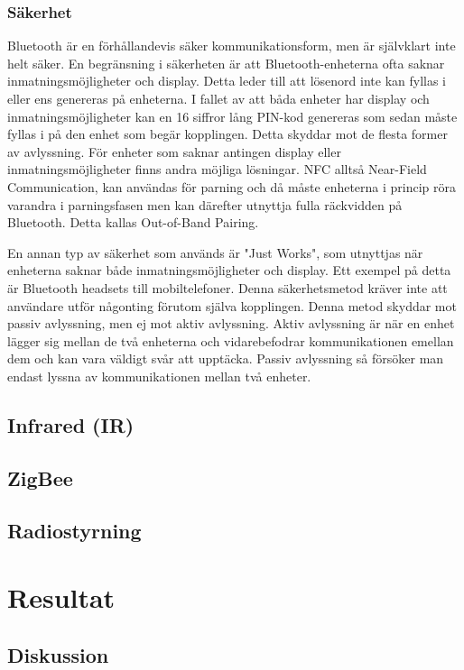 \documentclass[a4paper,12pt,fleqn]{article}
\begin{document}
\subsubsection{Säkerhet}
Bluetooth är en förhållandevis säker kommunikationsform, men är självklart inte helt säker. En begränsning i säkerheten är att Bluetooth-enheterna ofta saknar inmatningsmöjligheter och display. Detta leder till att lösenord inte kan fyllas i eller ens genereras på enheterna. I fallet av att båda enheter har display och inmatningsmöjligheter kan en 16 siffror lång PIN-kod genereras som sedan måste fyllas i på den enhet som begär kopplingen. Detta skyddar mot de flesta former av avlyssning.
För enheter som saknar antingen display eller inmatningsmöjligheter finns andra möjliga lösningar. NFC alltså Near-Field Communication, kan användas för parning och då måste enheterna i princip röra varandra i parningsfasen men kan därefter utnyttja fulla räckvidden på Bluetooth. Detta kallas Out-of-Band Pairing.

En annan typ av säkerhet som används är "Just Works", som utnyttjas när enheterna saknar både inmatningsmöjligheter och display. Ett exempel på detta är Bluetooth headsets till mobiltelefoner. Denna säkerhetsmetod kräver inte att användare utför någonting förutom själva kopplingen. Denna metod skyddar mot passiv avlyssning, men ej mot aktiv avlyssning. 
Aktiv avlyssning är när en enhet lägger sig mellan de två enheterna och vidarebefodrar kommunikationen emellan dem och kan vara väldigt svår att upptäcka.
Passiv avlyssning så försöker man endast lyssna av kommunikationen mellan två enheter. 


 
\subsection{Infrared (IR)}
\subsection{ZigBee}
\subsection{Radiostyrning}
\section{Resultat}
\subsection{Diskussion}
\end{document}
